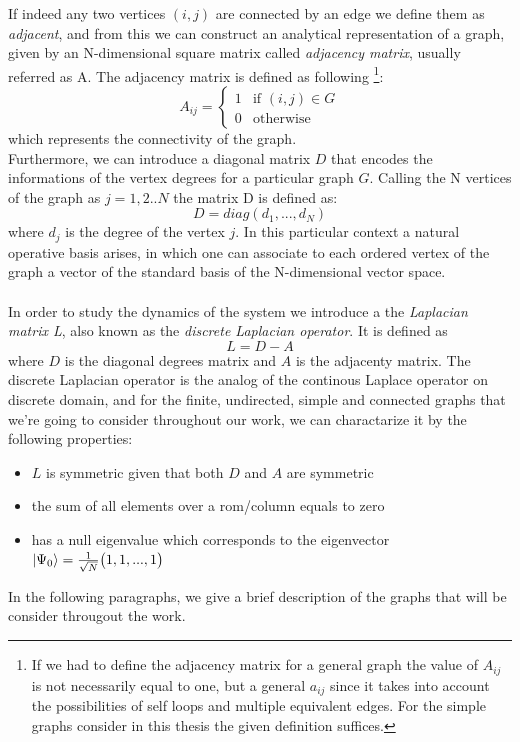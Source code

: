\noindent
If indeed any two vertices $(i,j)$ are connected by an edge we define them as \textit{adjacent}, and from this we can construct an analytical representation of a graph, given by an N-dimensional square matrix called \textit{adjacency matrix}, usually referred as A. The adjacency matrix is defined as following \footnote{If we had to define the adjacency matrix for a general graph the value of $A_{ij}$ is not necessarily equal to one, but a general $a_{ij}$ since it takes into account the possibilities of self loops and multiple equivalent edges. For the simple graphs consider in this thesis the given definition suffices.}:
\begin{equation}
A_{ij} = \begin{cases} 1 & \mbox{if }(i,j)\in G \\ 0 & \mbox{otherwise} \end{cases}
\end{equation}
which represents the connectivity of the graph. \\
Furthermore, we can introduce a diagonal matrix $D$ that encodes the informations of the vertex degrees for a particular graph $G$. Calling the N vertices of the graph as $j=1,2..N$ the matrix D is defined as:
\begin{equation}
    D = diag(d_1,..., d_N)
\end{equation}
where $d_j$ is the degree of the vertex $j$.
In this particular context a natural operative basis arises, in which one can associate to each ordered vertex of the graph a vector of the standard basis of the N-dimensional vector space. \\ \\


In order to study the dynamics of the system we introduce a the \textit{Laplacian matrix L}, also known as the \textit{discrete Laplacian operator}. It is defined as
\begin{equation}
    L = D-A
\end{equation}
where $D$ is the diagonal degrees matrix and $A$ is the adjacenty matrix. The discrete Laplacian operator is the analog of the continous Laplace operator on discrete domain, and for the finite, undirected, simple and connected graphs that we're going to consider throughout our work, we can charactarize it by the following properties:
\begin{itemize}
  \item $L$ is symmetric given that both $D$ and $A$ are symmetric
  \item the sum of all elements over a rom/column equals to zero
  \item has a null eigenvalue which corresponds to the eigenvector ${|{\Psi_0}\rangle} = \frac{1}{\sqrt{N}}\big(1,1,...,1\big)$
\end{itemize}
In the following paragraphs, we give a brief description of the graphs that will be consider througout the work. \\

